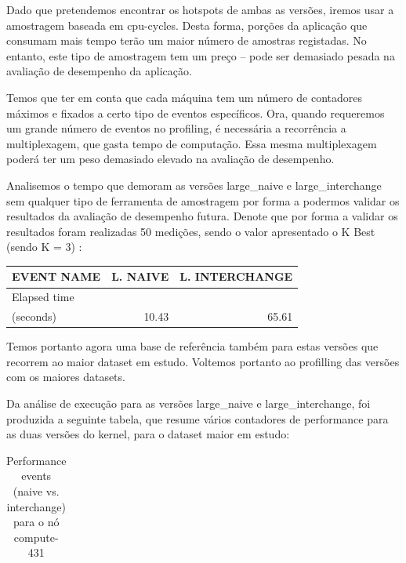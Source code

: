 \documentclass[conference,compsoc]{IEEEtran}
\begin{document}
\begin{itemize}
Dado que pretendemos encontrar os hotspots de ambas as versões, iremos usar a amostragem baseada em cpu-cycles. Desta forma, porções da aplicação que consumam mais tempo terão um maior número de amostras registadas. No entanto, este tipo de amostragem tem um preço -- pode ser demasiado pesada na avaliação de desempenho da aplicação. \par 

Temos que ter em conta que cada máquina tem um número de contadores máximos e fixados a certo tipo de eventos específicos. Ora, quando requeremos um grande número de eventos no profiling, é necessária a recorrência a multiplexagem, que gasta tempo de computação. Essa mesma multiplexagem poderá ter um peso demasiado elevado na avaliação de desempenho.\par 


Analisemos o tempo que demoram as versões large\_naive e large\_interchange sem qualquer tipo de ferramenta de amostragem por forma a podermos validar os resultados da avaliação de desempenho futura. Denote que por forma a validar os resultados foram realizadas 50 medições, sendo o valor apresentado o K Best (sendo K = 3) :

  \begin{table}[H]
  \label{table:base_rates}
  \centering
 \begin{tabular}{ | l | r | r |   }

  \hline
  EVENT NAME	 & L. NAIVE  & L. INTERCHANGE \\ \hline 
   Elapsed time & & \\ (seconds) & 10.43 & 65.61  \\ \hline    
  \end{tabular}
  \end{table}

Temos portanto agora uma base de referência também para estas versões que recorrem ao maior dataset em estudo. Voltemos portanto ao profilling das versões com os maiores datasets.\par 




Da análise de execução para as versões large\_naive e large\_interchange, foi produzida a seguinte tabela, que resume vários contadores de performance para as duas versões do kernel, para o dataset maior em estudo:

 \begin{table}[H]
  \caption{Performance events (naive vs. interchange) para o nó compute-431}
  \label{table:search_events_large}
  \centering
  \begin{tabular}{ | l | r | r |   }


\end{tabular}
\end{table}
\end{itemize}
\end{document}
